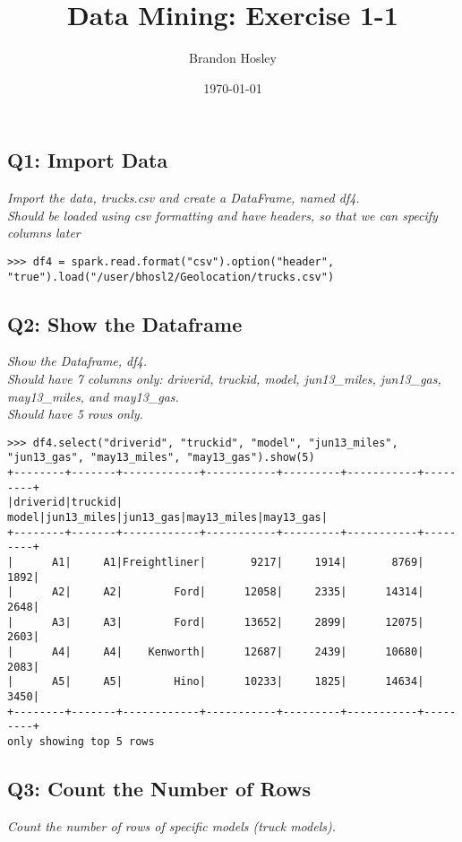 \documentclass[]{article}
\title{Data Mining: Exercise 1-1}
\author{Brandon Hosley}
\date{\today}
\begin{document}
\maketitle

\subsection*{Q1: Import Data}
\emph{Import the data, trucks.csv and create a DataFrame, named df4. \\
	Should be loaded using csv formatting and have headers, so that we can specify columns later}
\begin{verbatim}
>>> df4 = spark.read.format("csv").option("header", "true").load("/user/bhosl2/Geolocation/trucks.csv")
\end{verbatim}
	
\subsection*{Q2: Show the Dataframe}
\emph{Show the Dataframe, df4. \\
	Should have 7 columns only: driverid, truckid, model, 
	jun13\_miles, jun13\_gas, may13\_miles, and may13\_gas. \\
	Should have 5 rows only.} \\

\begin{verbatim}
>>> df4.select("driverid", "truckid", "model", "jun13_miles", "jun13_gas", "may13_miles", "may13_gas").show(5)
+--------+-------+------------+-----------+---------+-----------+---------+
|driverid|truckid|       model|jun13_miles|jun13_gas|may13_miles|may13_gas|
+--------+-------+------------+-----------+---------+-----------+---------+
|      A1|     A1|Freightliner|       9217|     1914|       8769|     1892|
|      A2|     A2|        Ford|      12058|     2335|      14314|     2648|
|      A3|     A3|        Ford|      13652|     2899|      12075|     2603|
|      A4|     A4|    Kenworth|      12687|     2439|      10680|     2083|
|      A5|     A5|        Hino|      10233|     1825|      14634|     3450|
+--------+-------+------------+-----------+---------+-----------+---------+
only showing top 5 rows
\end{verbatim}

\clearpage

\subsection*{Q3: Count the Number of Rows}
\emph{Count the number of rows of specific models (truck models).} \\
\end{document}
